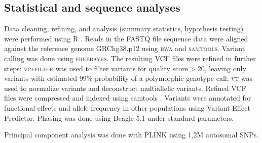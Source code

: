 

\subsection*{Statistical and sequence analyses}
Data cleaning, refining, and analysis (summary statistics, hypothesis testing) were performed using R \cite{R}.
Reads in the FASTQ file sequence data were aligned against the reference genome GRChg38.p12 using \textsc{bwa}\cite{li2013aligning} and \textsc{samtools}\cite{li2011statistical}. Variant calling was done using \textsc{freebayes}\cite{garrison2012haplotype}. The resulting VCF files were refined in further steps: \textsc{vcffilter} \cite{vcflib} was used to filter variants for quality score$>$20, leaving only variants with estimated 99\% probability of a polymorphic genotype call; \textsc{vt}\cite{tan2015unified} was used to normalize variants and deconstruct multiallelic variants. Refined VCF files were compressed and indexed using samtools \cite{li2011statistical}. Variants were annotated for functional effects and allele frequency in other populations using Variant Effect Predictor\cite{mclaren2016ensembl}. Phasing was done using Beagle 5.1\cite{browning2018one} under standard parameters.  

Principal component analysis was done with PLINK\cite{chang2015second} using 1,2M autosomal SNPs. 

